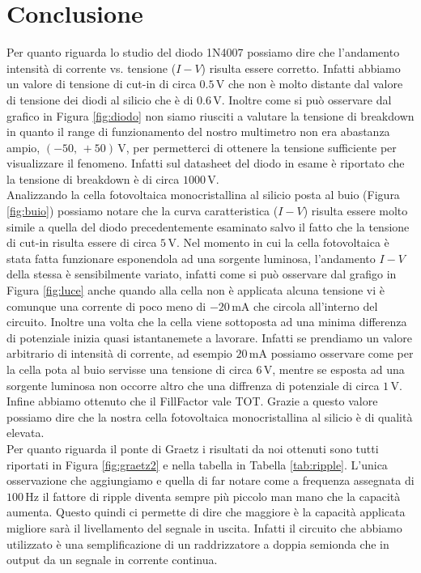 \section*{Conclusione}

Per quanto riguarda lo studio del diodo 1N4007 possiamo dire che l'andamento intensità di corrente vs. tensione ($I-V$) risulta essere corretto. Infatti abbiamo un valore di tensione di cut-in di circa $0.5\,\si{\volt}$ che non è molto distante dal valore di tensione dei diodi al silicio che è di $0.6\,\si{\volt}$.
Inoltre come si può osservare dal grafico in Figura \ref{fig:diodo} non siamo riusciti a valutare la tensione di breakdown in quanto il range di funzionamento del nostro multimetro non era abastanza ampio, $(-50,\,+50)\,\si{\volt}$, per permetterci di ottenere la tensione sufficiente per visualizzare il fenomeno. Infatti sul datasheet del diodo in esame è riportato che la tensione di breakdown è di circa $1000\,\si{\volt}$.\\

Analizzando la cella fotovoltaica monocristallina al silicio posta al buio (Figura \ref{fig:buio}) possiamo notare che la curva caratteristica ($I-V$) risulta essere molto simile a quella del diodo precedentemente esaminato salvo il fatto che la tensione di cut-in risulta essere di circa $5\,\si{\volt}$.
Nel momento in cui la cella fotovoltaica è stata fatta funzionare esponendola ad una sorgente luminosa, l'andamento $I-V$ della stessa è sensibilmente variato, infatti come si può osservare dal grafigo in Figura \ref{fig:luce} anche quando alla cella non è applicata alcuna tensione vi è comunque una corrente di poco meno di $-20\,\si{\milli\ampere}$ che circola all'interno del circuito.
Inoltre una volta che la cella viene sottoposta ad una minima differenza di potenziale inizia quasi istantanemete a lavorare. Infatti se prendiamo un valore arbitrario di intensità di corrente, ad esempio $20\,\si{\milli\ampere}$ possiamo osservare come per la cella pota al buio servisse una tensione di circa $6\,\si{\volt}$, mentre se esposta ad una sorgente luminosa non occorre altro che una diffrenza di potenziale di circa $1\,\si{\volt}$.
Infine abbiamo ottenuto che il FillFactor vale TOT. Grazie a questo valore possiamo dire che la nostra cella fotovoltaica monocristallina al silicio è di qualità elevata.\\

Per quanto riguarda il ponte di Graetz i risultati da noi ottenuti sono tutti riportati in Figura \ref{fig:graetz2} e nella tabella in Tabella \ref{tab:ripple}. L'unica osservazione che aggiungiamo e quella di far notare come a frequenza assegnata di $100\,\si{\hertz}$ il fattore di ripple diventa sempre più piccolo man mano che la capacità aumenta. Questo quindi ci permette di dire che maggiore è la capacità applicata migliore sarà il livellamento del segnale in uscita. Infatti il circuito che abbiamo utilizzato è una semplificazione di un raddrizzatore a doppia semionda che in output da un segnale in corrente continua.